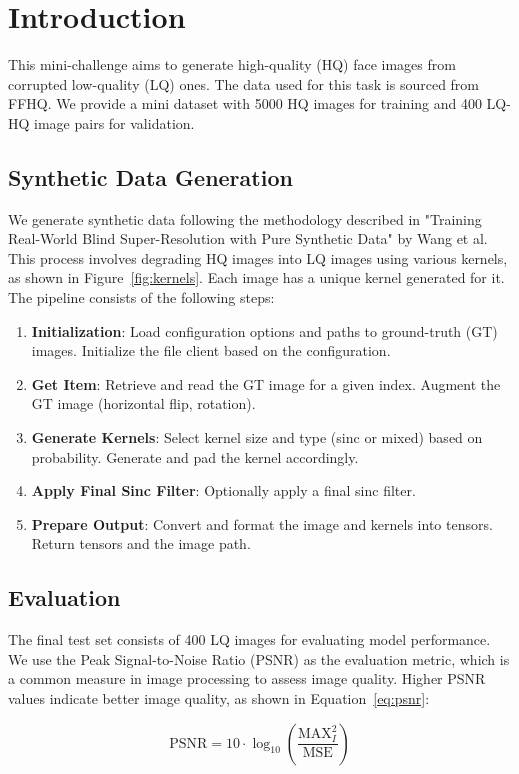 \section{Introduction}
\label{sec:introduction}

This mini-challenge aims to generate high-quality (HQ) face images from corrupted low-quality (LQ) ones. The data used for this task is sourced from FFHQ. We provide a mini dataset with 5000 HQ images for training and 400 LQ-HQ image pairs for validation.

\subsection{Synthetic Data Generation}
\label{subsec:synthetic-data-generation}

We generate synthetic data following the methodology described in "Training Real-World Blind Super-Resolution with Pure Synthetic Data" by Wang et al. This process involves degrading HQ images into LQ images using various kernels, as shown in Figure~\ref{fig:kernels}. Each image has a unique kernel generated for it. The pipeline consists of the following steps:

\begin{enumerate}
    \item \textbf{Initialization}: Load configuration options and paths to ground-truth (GT) images. Initialize the file client based on the configuration.
    
    \item \textbf{Get Item}: Retrieve and read the GT image for a given index. Augment the GT image (horizontal flip, rotation).
    
    \item \textbf{Generate Kernels}: Select kernel size and type (sinc or mixed) based on probability. Generate and pad the kernel accordingly.
    
    \item \textbf{Apply Final Sinc Filter}: Optionally apply a final sinc filter.
    
    \item \textbf{Prepare Output}: Convert and format the image and kernels into tensors. Return tensors and the image path.
\end{enumerate}

\subsection{Evaluation}
\label{subsec:evaluation}

The final test set consists of 400 LQ images for evaluating model performance. We use the Peak Signal-to-Noise Ratio (PSNR) as the evaluation metric, which is a common measure in image processing to assess image quality. Higher PSNR values indicate better image quality, as shown in Equation~\ref{eq:psnr}:

\begin{equation}
    \text{PSNR} = 10 \cdot \log_{10} \left( \frac{\text{MAX}_I^2}{\text{MSE}} \right)
    \label{eq:psnr}
\end{equation}
